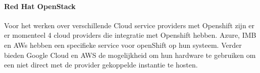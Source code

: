 \paragraph{Red Hat OpenStack}
Voor het werken over verschillende Cloud service providers met Openshift zijn er er momenteel 4 cloud providers die integratie met Openshift hebben. Azure, IMB en AWs hebben een specifieke service voor openShift op hun systeem. Verder bieden Google Cloud en AWS de mogelijkheid om hun hardware te gebruiken om een niet direct met de provider gekoppelde instantie te hosten.



